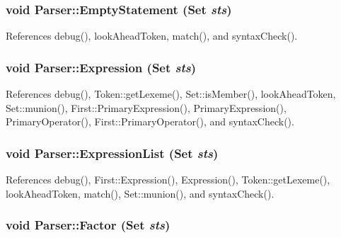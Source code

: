 \hypertarget{classParser_aa5c2ec1d4c045a6783887bd7453e99ed}{
\subsubsection[{EmptyStatement}]{\setlength{\rightskip}{0pt plus 5cm}void Parser::EmptyStatement ({\bf Set} {\em sts})}}
\label{classParser_aa5c2ec1d4c045a6783887bd7453e99ed}


References debug(), lookAheadToken, match(), and syntaxCheck().

\hypertarget{classParser_a155ac163cd68b4e1b8098b43be1189e1}{
\subsubsection[{Expression}]{\setlength{\rightskip}{0pt plus 5cm}void Parser::Expression ({\bf Set} {\em sts})}}
\label{classParser_a155ac163cd68b4e1b8098b43be1189e1}


References debug(), Token::getLexeme(), Set::isMember(), lookAheadToken, Set::munion(), First::PrimaryExpression(), PrimaryExpression(), PrimaryOperator(), First::PrimaryOperator(), and syntaxCheck().

\hypertarget{classParser_a867bebdf8a97af4991fe044b9d7e616b}{
\subsubsection[{ExpressionList}]{\setlength{\rightskip}{0pt plus 5cm}void Parser::ExpressionList ({\bf Set} {\em sts})}}
\label{classParser_a867bebdf8a97af4991fe044b9d7e616b}


References debug(), First::Expression(), Expression(), Token::getLexeme(), lookAheadToken, match(), Set::munion(), and syntaxCheck().

\hypertarget{classParser_a1310e1db541b2a3b614ec4491b7196ea}{
\subsubsection[{Factor}]{\setlength{\rightskip}{0pt plus 5cm}void Parser::Factor ({\bf Set} {\em sts})}}
\label{classParser_a1310e1db541b2a3b614ec4491b7196ea}


